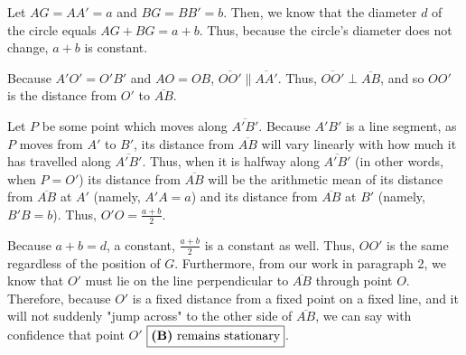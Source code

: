\begin{enumerate}
 Let $AG=AA'=a$ and $BG=BB'=b$. Then, we know that the diameter $d$ of the circle equals $AG+BG=a+b$. Thus, because the circle's diameter does not change, $a+b$ is constant. 

 Because $A'O'=O'B'$ and $AO=OB$, $\overline{OO'} \parallel \overline{AA'}$. Thus, $\overline{OO'} \perp \overline{AB}$, and so $OO'$ is the distance from $O'$ to $\overline{AB}$. 

 Let $P$ be some point which moves along $\overline{A'B'}$. Because $A'B'$ is a line segment, as $P$ moves from $A'$ to $B'$, its distance from $\overline{AB}$ will vary linearly with how much it has travelled along $\overline{A'B'}$. Thus, when it is halfway along $\overline{A'B'}$ (in other words, when $P=O'$) its distance from $\overline{AB}$ will be the arithmetic mean of its distance from $\overline{AB}$ at $A'$ (namely, $A'A=a$) and its distance from $\overline{AB}$ at $B'$ (namely, $B'B=b$). Thus, $O'O = \frac{a+b}2$. 

 Because $a+b=d$, a constant, $\frac{a+b}2$ is a constant as well. Thus, $OO'$ is the same regardless of the position of $G$. Furthermore, from our work in paragraph 2, we know that $O'$ must lie on the line perpendicular to $\overline{AB}$ through point $O$. Therefore, because $O'$ is a fixed distance from a fixed point on a fixed line, and it will not suddenly "jump across" to the other side of $\overline{AB}$, we can say with confidence that point $O'$ $\fbox{\textbf{(B)} remains stationary}$.

 


\end{enumerate}